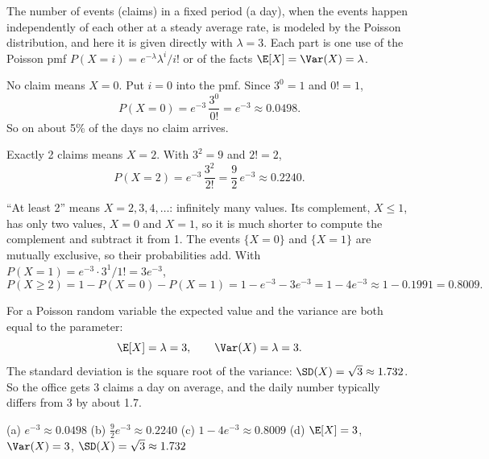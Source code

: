 \begin{solution}
	\idea The number of events (claims) in a fixed period (a day), when the
	events happen independently of each other at a steady average rate, is
	modeled by the Poisson distribution, and here it is given directly with
	$\lambda=3$. Each part is one use of the Poisson pmf
	$P(X=i)=e^{-\lambda}\lambda^i/i!$ or of the facts
	$\E[X]=\Var(X)=\lambda$.

	 No claim means $X=0$. Put $i=0$ into the pmf. Since
	$3^0=1$ and $0!=1$,
	\[ P(X=0)=e^{-3}\,\frac{3^0}{0!}=e^{-3}\approx0.0498. \]
	So on about 5\% of the days no claim arrives.

	 Exactly 2 claims means $X=2$. With $3^2=9$ and $2!=2$,
	\[ P(X=2)=e^{-3}\,\frac{3^2}{2!}=\frac92\,e^{-3}\approx0.2240. \]

	 ``At least 2'' means $X=2,3,4,\dots$: infinitely many values.
	Its complement, $X\le1$, has only two values, $X=0$ and $X=1$, so it is
	much shorter to compute the complement and subtract it from 1. The events
	$\{X=0\}$ and $\{X=1\}$ are mutually exclusive, so their probabilities
	add. With $P(X=1)=e^{-3}\cdot3^1/1!=3e^{-3}$,
	\[ P(X\ge2)=1-P(X=0)-P(X=1)=1-e^{-3}-3e^{-3}=1-4e^{-3}\approx1-0.1991
		=0.8009. \]

	 For a Poisson random variable the expected value and the
	variance are both equal to the parameter:
	\[ \E[X]=\lambda=3,\qquad \Var(X)=\lambda=3. \]
	The standard deviation is the square root of the variance:
	$\SD(X)=\sqrt3\approx1.732$. So the office gets 3 claims a day on
	average, and the daily number typically differs from 3 by about 1.7.
	\begin{answer}
		(a) $e^{-3}\approx0.0498$ \quad
		(b) $\frac92e^{-3}\approx0.2240$ \quad
		(c) $1-4e^{-3}\approx0.8009$ \quad
		(d) $\E[X]=3$, $\Var(X)=3$, $\SD(X)=\sqrt3\approx1.732$
	\end{answer}
\end{solution}
